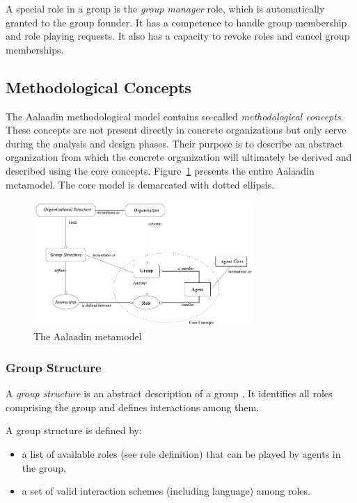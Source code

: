 A special role in a group is the \textit{group manager} role, which is automatically granted to the group founder.
It has a competence to handle group membership and role playing requests.
It also has a capacity to revoke roles and cancel group memberships.

\subsection{Methodological Concepts}

The Aalaadin methodological model contains so-called \textit{methodological concepts}.
These concepts are not present directly in concrete organizations but only serve during the analysis and design phases.
Their purpose is to describe an abstract organization from which the concrete organization will ultimately be derived and described using the core concepts.
Figure~\ref{figure:aalaadin-metamodel} presents the entire Aalaadin metamodel. The core model is demarcated with dotted ellipsis.

\begin{figure}[h]
	\centering
	\includegraphics[width=0.75\textwidth]{images/aalaadin-metamodel.png}
	\caption{The Aalaadin metamodel}
	\label{figure:aalaadin-metamodel}
\end{figure}

\subsubsection*{Group Structure}

A \textit{group structure} is an abstract description of a group \cite{Ferber97}.
It identifies all roles comprising the group and defines interactions among them.

A group structure is defined by:
\begin{itemize}
	\item a list of available roles (see role definition) that can be played by agents in the group,
	\item a set of valid interaction schemes (including language) among roles.
\end{itemize}

